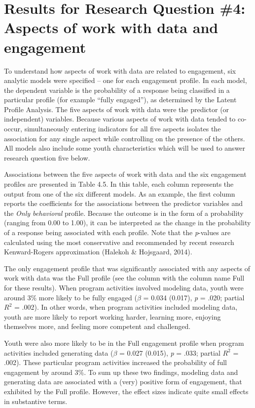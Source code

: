 \documentclass[]{msu-thesis}
\theoremstyle{definition}
\theoremstyle{definition}
\theoremstyle{definition}
\theoremstyle{remark}
\begin{document}
\section{Results for Research Question \#4: Aspects of work with data
and
engagement}\label{results-for-research-question-4-aspects-of-work-with-data-and-engagement}

To understand how aspects of work with data are related to engagement,
six analytic models were specified -- one for each engagement profile.
In each model, the dependent variable is the probability of a response
being classified in a particular profile (for example ``fully
engaged''), as determined by the Latent Profile Analysis. The five
aspects of work with data were the predictor (or independent) variables.
Because various aspects of work with data tended to co-occur,
simultaneously entering indicators for all five aspects isolates the
association for any single aspect while controlling on the presence of
the others. All models also include some youth characteristics which
will be used to answer research question five below.

Associations between the five aspects of work with data and the six
engagement profiles are presented in Table 4.5. In this table, each
column represents the output from one of the six different models. As an
example, the first column reports the coefficients for the associations
between the predictor variables and the \emph{Only behavioral} profile.
Because the outcome is in the form of a probability (ranging from 0.00
to 1.00), it can be interpreted as the change in the probability of a
response being associated with each profile. Note that the
\emph{p}-values are calculated using the most conservative and
recommended by recent research Kenward-Rogers approximation (Halekoh \&
Hojsgaard, 2014).

The only engagement profile that was significantly associated with any
aspects of work with data was the Full profile (see the column with the
column name Full for these results). When program activities involved
modeling data, youth were around 3\% more likely to be fully engaged
(\(\beta\) = 0.034 (0.017), \emph{p} = .020; partial \(R^2\) = .002). In
other words, when program activities included modeling data, youth are
more likely to report working harder, learning more, enjoying themselves
more, and feeling more competent and challenged.

Youth were also more likely to be in the Full engagement profile when
program activities included generating data (\(\beta\) = 0.027 (0.015),
\emph{p} = .033; partial \(R^2\) = .002). These particular program
activities increased the probability of full engagement by around 3\%.
To sum up these two findings, modeling data and generating data are
associated with a (very) positive form of engagement, that exhibited by
the Full profile. However, the effect sizes indicate quite small effects
in substantive terms.
\end{document}
